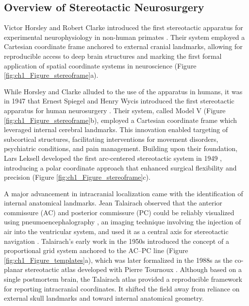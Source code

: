 \subsection{Overview of Stereotactic Neurosurgery}
Victor Horsley and Robert Clarke introduced the first stereotactic apparatus for experimental neurophysiology in non-human primates \cite{Horsley1908-om}. Their system employed a Cartesian coordinate frame anchored to external cranial landmarks, allowing for reproducible access to deep brain structures and marking the first formal application of spatial coordinate systems in neuroscience (Figure \ref{fig:ch1_Figure_stereoframe}a).

While Horsley and Clarke alluded to the use of the apparatus in humans, it was in 1947 that Ernest Spiegel and Henry Wycis introduced the first stereotactic apparatus for human neurosurgery \cite{Spiegel1947-rq}. Their system, called Model V (Figure \ref{fig:ch1_Figure_stereoframe}b), employed a Cartesian coordinate frame which leveraged internal cerebral landmarks. This innovation enabled targeting of subcortical structures, facilitating interventions for movement disorders, psychiatric conditions, and pain management. Building upon their foundation, Lars Leksell developed the first arc-centered stereotactic system in 1949 \cite{Leksell1949-wl}, introducing a polar coordinate approach that enhanced surgical flexibility and precision (Figure \ref{fig:ch1_Figure_stereoframe}c).

A major advancement in intracranial localization came with the identification of internal anatomical landmarks. Jean Talairach observed that the anterior commissure (AC) and posterior commissure (PC) could be reliably visualized using pneumoencephalography \cite{Dandy1918-os}, an imaging technique involving the injection of air into the ventricular system, and used it as a central axis for stereotactic navigation \cite{Talalrach1957-bs}. Talairach’s early work in the 1950s introduced the concept of a proportional grid system anchored to the AC–PC line (Figure \ref{fig:ch1_Figure_templates}a), which was later formalized in the 1988s as the co-planar stereotactic atlas developed with Pierre Tournoux \cite{Talairach1988-wk}. Although based on a single postmortem brain, the Talairach atlas provided a reproducible framework for reporting intracranial coordinates. It shifted the field away from reliance on external skull landmarks and toward internal anatomical geometry.

